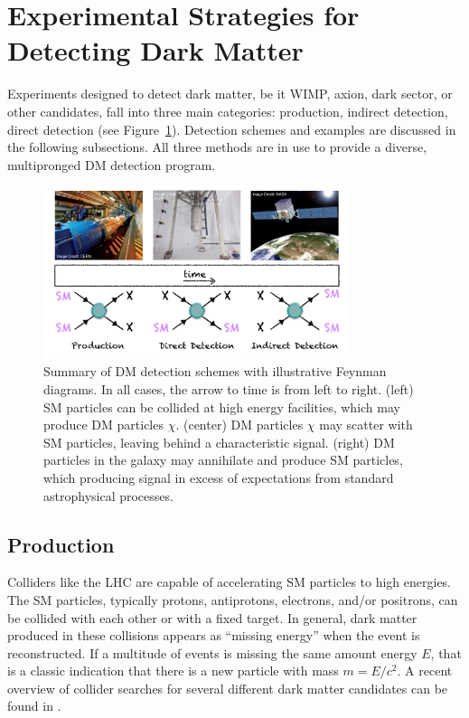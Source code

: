 \section{Experimental Strategies for Detecting Dark Matter}
\label{sec:dm_detection_schemes}
Experiments designed to detect dark matter, be it \ac{WIMP}, axion, dark sector, or other candidates, fall into three main categories: production, indirect detection, direct detection (see Figure~\ref{fig:dm_detection_schemes}). Detection schemes and examples are discussed in the following subsections. All three methods are in use to provide a diverse, multipronged \ac{DM} detection program. 

\begin{figure}[htbp]
\begin{center}
\includegraphics[width=0.8\textwidth]{figures/theory/dm_detection_schemes.png}
\caption{Summary of \ac{DM} detection schemes with illustrative Feynman diagrams. In all cases, the arrow to time is from left to right. (left) \ac{SM} particles can be collided at high energy facilities, which may produce \ac{DM} particles $\chi$. (center) \ac{DM} particles $\chi$ may scatter with \ac{SM} particles, leaving behind a characteristic signal. (right) \ac{DM} particles in the galaxy may annihilate and produce \ac{SM} particles, which producing signal in excess of expectations from standard astrophysical processes.}
\label{fig:dm_detection_schemes}
\end{center}
\end{figure}

\subsection{Production}
Colliders like the \ac{LHC} are capable of accelerating \ac{SM} particles to high energies. The \ac{SM} particles, typically protons, antiprotons, electrons, and/or positrons, can be collided with each other or with a fixed target. In general, dark matter produced in these collisions appears as ``missing energy'' when the event is reconstructed. If a multitude of events is missing the same amount energy $E$, that is a classic indication that there is a new particle with mass $m = E/c^{2}$. A recent overview of collider searches for several different dark matter candidates can be found in \cite{Penning2018}. 

